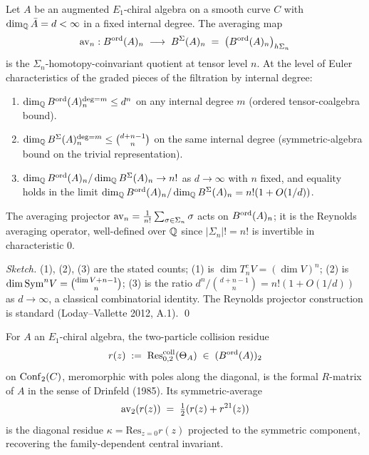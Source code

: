 \begin{theorem}
\label{wn:thm:opus-P1-math}\ClaimStatusTheorem
Let $A$ be an augmented $E_1$-chiral algebra on a smooth curve $C$ with
$\dim_{\mathbb{Q}} \bar A = d < \infty$ in a fixed internal degree. The averaging
map
\[
\mathrm{av}_n : B^{\mathrm{ord}}(A)_n \;\longrightarrow\; B^{\Sigma}(A)_n \;=\;
\bigl(B^{\mathrm{ord}}(A)_n\bigr)_{h\Sigma_n}
\]
is the $\Sigma_n$-homotopy-coinvariant quotient at tensor level $n$.
At the level of Euler characteristics of the graded pieces of the
filtration by internal degree:
\begin{enumerate}
\item $\dim_{\mathbb{Q}} B^{\mathrm{ord}}(A)_n^{\deg = m} \le d^n$ on any internal degree
$m$ (ordered tensor-coalgebra bound).
\item $\dim_{\mathbb{Q}} B^{\Sigma}(A)_n^{\deg = m} \le \binom{d + n - 1}{n}$ on the
same internal degree (symmetric-algebra bound on the trivial
representation).
\item $\dim_{\mathbb{Q}} B^{\mathrm{ord}}(A)_n / \dim_{\mathbb{Q}} B^{\Sigma}(A)_n \to n!$ as $d \to \infty$
with $n$ fixed, and equality holds in the limit
$\dim_{\mathbb{Q}} B^{\mathrm{ord}}(A)_n / \dim_{\mathbb{Q}} B^{\Sigma}(A)_n = n!(1 + O(1/d))$.
\end{enumerate}
The averaging projector $\mathrm{av}_n = \tfrac{1}{n!} \sum_{\sigma \in \Sigma_n}
\sigma$ acts on $B^{\mathrm{ord}}(A)_n$; it is the Reynolds averaging operator,
well-defined over $\mathbb{Q}$ since $|\Sigma_n|! = n!$ is invertible in
characteristic $0$.
\end{theorem}

\begin{proof}[Sketch]
(1), (2), (3) are the stated counts; (1) is $\dim T^c_n V = (\dim V)^n$;
(2) is $\dim \mathrm{Sym}^n V = \binom{\dim V + n - 1}{n}$; (3) is the ratio
$d^n / \binom{d+n-1}{n} = n! (1 + O(1/d))$ as $d \to \infty$, a
classical combinatorial identity. The Reynolds projector construction is
standard (Loday--Vallette 2012, A.1). \qed
\end{proof}

\begin{corollary}
\label{wn:cor:opus-P1-1-Rmatrix}\ClaimStatusTheorem
For $A$ an $E_1$-chiral algebra, the two-particle collision residue
\[
r(z) \;:=\; \mathrm{Res}^{\mathrm{coll}}_{0, 2}(\Theta_A) \;\in\;
(B^{\mathrm{ord}}(A))_2
\]
on $\mathrm{Conf}_2(C)$, meromorphic with poles along the diagonal, is the
formal $R$-matrix of $A$ in the sense of Drinfeld (1985). Its
symmetric-average
\[
\mathrm{av}_2(r(z)) \;=\; \tfrac{1}{2}(r(z) + r^{21}(z))
\]
is the diagonal residue $\kappa = \mathrm{Res}_{z=0} r(z)$ projected to
the symmetric component, recovering the family-dependent central
invariant.
\end{corollary}

